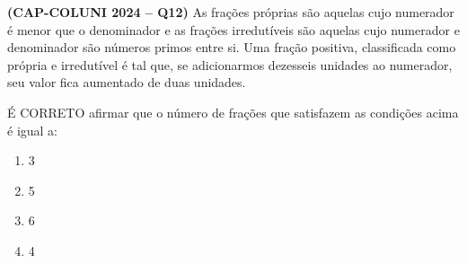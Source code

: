\textbf{(CAP-COLUNI 2024 -- Q12)} As frações próprias são aquelas cujo numerador é menor que o denominador e as frações irredutíveis são aquelas cujo numerador e denominador são números primos entre si. Uma fração positiva, classificada como própria e irredutível é tal que, se adicionarmos dezesseis unidades ao numerador, seu valor fica aumentado de duas unidades.

É CORRETO afirmar que o número de frações que satisfazem as condições acima é igual a:

\begin{enumerate}
	\item 3
	\item 5
	\item 6
	\item 4
\end{enumerate}
